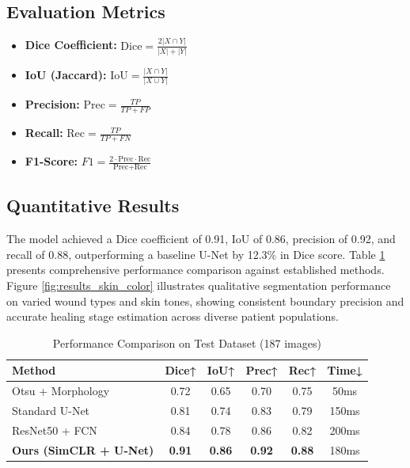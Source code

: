 \documentclass[conference]{IEEEtran}
\begin{document}
\subsection{Evaluation Metrics}
\begin{itemize}
    \item \textbf{Dice Coefficient:} $\text{Dice} = \frac{2|X \cap Y|}{|X| + |Y|}$
    \item \textbf{IoU (Jaccard):} $\text{IoU} = \frac{|X \cap Y|}{|X \cup Y|}$
    \item \textbf{Precision:} $\text{Prec} = \frac{TP}{TP + FP}$
    \item \textbf{Recall:} $\text{Rec} = \frac{TP}{TP + FN}$
    \item \textbf{F1-Score:} $F1 = \frac{2 \cdot \text{Prec} \cdot \text{Rec}}{\text{Prec} + \text{Rec}}$
\end{itemize}

\subsection{Quantitative Results}

The model achieved a Dice coefficient of 0.91, IoU of 0.86, precision of 0.92, and recall of 0.88, outperforming a baseline U-Net by 12.3\% in Dice score. Table \ref{tab:comparison} presents comprehensive performance comparison against established methods. Figure \ref{fig:results_skin_color} illustrates qualitative segmentation performance on varied wound types and skin tones, showing consistent boundary precision and accurate healing stage estimation across diverse patient populations.

\begin{table}[h]
\centering
\caption{Performance Comparison on Test Dataset (187 images)}
\label{tab:comparison}
\begin{tabular}{lccccc}
\toprule
\textbf{Method} & \textbf{Dice↑} & \textbf{IoU↑} & \textbf{Prec↑} & \textbf{Rec↑} & \textbf{Time↓} \\
\midrule
Otsu + Morphology & 0.72 & 0.65 & 0.70 & 0.75 & 50ms \\
Standard U-Net & 0.81 & 0.74 & 0.83 & 0.79 & 150ms \\
ResNet50 + FCN & 0.84 & 0.78 & 0.86 & 0.82 & 200ms \\
\textbf{Ours (SimCLR + U-Net)} & \textbf{0.91} & \textbf{0.86} & \textbf{0.92} & \textbf{0.88} & 180ms \\
\bottomrule
\end{tabular}
\end{table}
\end{document}
